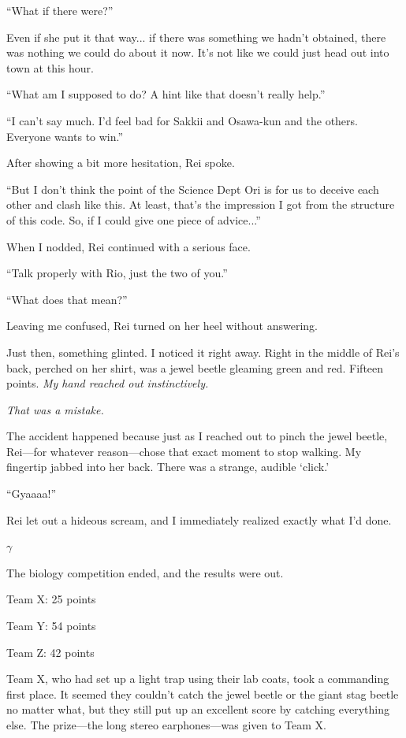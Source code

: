\documentclass[
    a4paper,
    12pt,
    twoside,
    openany,
    UTF8,
    fontset=windows
]{ctexbook}
\begin{document}
``What if there were?''

Even if she put it that way... if there was something we hadn't obtained, there was nothing we could do about it now. It's not like we could just head out into town at this hour.

``What am I supposed to do? A hint like that doesn't really help.''

``I can't say much. I'd feel bad for Sakkii and Osawa-kun and the others. Everyone wants to win.''

After showing a bit more hesitation, Rei spoke.

``But I don't think the point of the Science Dept Ori is for us to deceive each other and clash like this. At least, that's the impression I got from the structure of this code. So, if I could give one piece of advice...''

When I nodded, Rei continued with a serious face.

``Talk properly with Rio, just the two of you.''

``What does that mean?''

Leaving me confused, Rei turned on her heel without answering.

Just then, something glinted. I noticed it right away. Right in the middle of Rei's back, perched on her shirt, was a jewel beetle gleaming green and red. Fifteen points. \textit{My hand reached out instinctively.}

\textit{That was a mistake.}

The accident happened because just as I reached out to pinch the jewel beetle, Rei---for whatever reason---chose that exact moment to stop walking. My fingertip jabbed into her back. There was a strange, audible `click.'

``Gyaaaa!''

Rei let out a hideous scream, and I immediately realized exactly what I'd done.

$\gamma$

The biology competition ended, and the results were out.

\begin{center}
Team X: 25 points

Team Y: 54 points

Team Z: 42 points
\end{center}

Team X, who had set up a light trap using their lab coats, took a commanding first place. It seemed they couldn't catch the jewel beetle or the giant stag beetle no matter what, but they still put up an excellent score by catching everything else. The prize---the long stereo earphones---was given to Team X.
\end{document}
